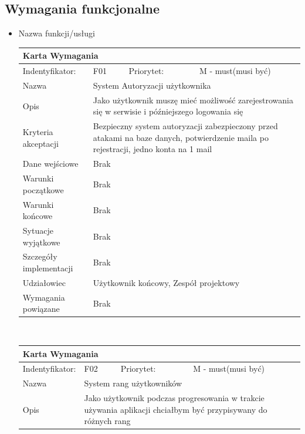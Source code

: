 \documentclass[a4paper,11pt]{report}
\begin{document}
	\subsection {Wymagania funkcjonalne}
	\begin{itemize}
		\item Nazwa funkcji/usługi\\
		\begin{tabular}{|p{3cm}|p{2cm}|p{2cm}|p{6cm}|}
		\hline
		\multicolumn{4}{|p{12 cm}|}{Karta Wymagania}\\
		\hline
		Indentyfikator: & F01 & Priorytet: & M - must(musi być)\\
		\hline
		Nazwa & \multicolumn{3}{|p{10 cm}|}{System Autoryzacji użytkownika}\\
		\hline
		Opis & \multicolumn{3}{|p{10 cm}|}{Jako użytkownik muszę mieć możliwość zarejestrowania się w serwisie i późniejszego logowania się}\\
		\hline
		Kryteria akceptacji & \multicolumn{3}{|p{10 cm}|}{Bezpieczny system autoryzacji zabezpieczony przed atakami na baze danych, potwierdzenie maila po rejestracji,  jedno konta na 1 mail}\\
		\hline
		Dane wejściowe & \multicolumn{3}{|p{10 cm}|}{Brak}\\
		\hline
		Warunki początkowe & \multicolumn{3}{|p{10 cm}|}{Brak}\\
		\hline
		Warunki końcowe & \multicolumn{3}{|p{10 cm}|}{Brak}\\
		\hline
		Sytuacje wyjątkowe & \multicolumn{3}{|p{10 cm}|}{Brak}\\
		\hline
		Szczegóły implementacji & \multicolumn{3}{|p{10 cm}|}{Brak}\\
		\hline
		Udziałowiec & \multicolumn{3}{|p{10 cm}|}{Użytkownik końcowy, Zespół projektowy}\\
		\hline
		Wymagania powiązane & \multicolumn{3}{|p{10 cm}|}{Brak}\\
		\hline
		\end{tabular}\\
		\begin{tabular}{|p{3cm}|p{2cm}|p{2cm}|p{6cm}|}
		\hline
		\multicolumn{4}{|p{12 cm}|}{Karta Wymagania}\\
		\hline
		Indentyfikator: & F02 & Priorytet: & M - must(musi być)\\
		\hline
		Nazwa & \multicolumn{3}{|p{10 cm}|}{System rang użytkowników}\\
		\hline
		Opis & \multicolumn{3}{|p{10 cm}|}{Jako użytkownik podczas progresowania w trakcie używania aplikacji chciałbym być przypisywany do różnych rang}\\

\end{tabular}
\end{itemize}
\end{document}
